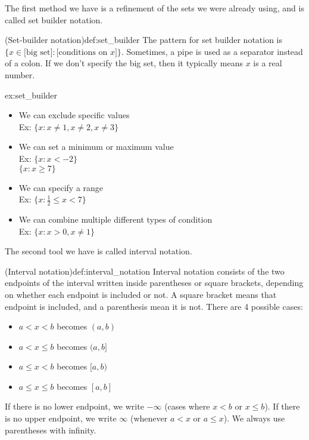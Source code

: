 \documentclass{article}
\begin{document}
The first method we have is a refinement of the sets we were already using, and is called set builder notation.

\begin{definition}{(Set-builder notation)}{def:set_builder}
    The pattern for set builder notation is $\{x\in \text{[big set]}:\text{[conditions on $x$]}\}$. Sometimes, a pipe is used as a separator instead of a colon. If we don't specify the big set, then it typically means $x$ is a real number.
\end{definition}

\begin{example}{}{ex:set_builder}
    \begin{itemize}
        \item We can exclude specific values\\Ex: $\{x : x\neq 1,x\neq 2,x\neq 3\}$
        \item We can set a minimum or maximum value\\Ex: $\{x : x<-2\}$\\\phantom{Ex: }$\{x : x\geq 7\}$
        \item We can specify a range\\Ex: $\{x : \frac{1}{2}\leq x < 7\}$
        \item We can combine multiple different types of condition\\Ex: $\{x : x > 0, x\neq 1\}$
    \end{itemize}
\end{example}

The second tool we have is called interval notation. 

\begin{definition}{(Interval notation)}{def:interval_notation}
    Interval notation consists of the two endpoints of the interval written inside parentheses or square brackets, depending on whether each endpoint is included or not. A square bracket means that endpoint is included, and a parenthesis mean it is not. There are 4 possible cases:
    \begin{itemize}
        \item $a<x<b$ becomes $(a,b)$
        \item $a<x\leq b$ becomes $(a,b]$
        \item $a\leq x<b$ becomes $[a,b)$
        \item $a\leq x\leq b$ becomes $[a,b]$
    \end{itemize}
    If there is no lower endpoint, we write $-\infty$ (cases where $x<b$ or $x\leq b$). If there is no upper endpoint, we write $\infty$ (whenever $a<x$ or $a\leq x$). We always use parentheses with infinity.
\end{definition}
\end{document}
